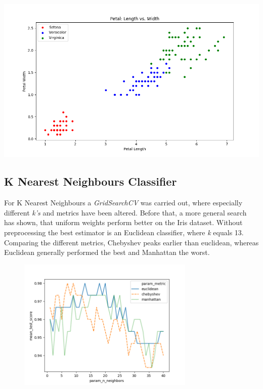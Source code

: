 \documentclass{article}
\begin{document}
\image

\includegraphics[width=\textwidth]{plots/petal.png}

\subsection{K Nearest Neighbours Classifier}
For K Nearest Neighbours a \textit{GridSearchCV} was carried out, where especially different \textit{k's} and metrics have been altered. Before that, a more general search has shown, that uniform weights perform better on the Iris dataset. Without preprocessing the best estimator is an Euclidean classifier, where \textit{k} equals 13. Comparing the different metrics, Chebyshev peaks earlier than euclidean, whereas Euclidean generally performed the best and Manhattan the worst. 

\begin{figure}[ht]
\begin{center}
\includegraphics[width=0.75\textwidth]{plots/knn_np_comparision.png}
\end{center}
\end{figure}
\end{document}
